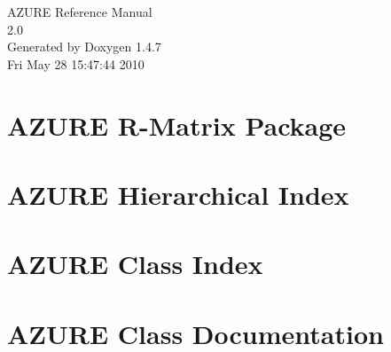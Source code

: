 \documentclass[a4paper]{book}
\begin{document}
\begin{titlepage}
\vspace*{7cm}
\begin{center}
{\Large AZURE Reference Manual\\[1ex]\large 2.0 }\\
\vspace*{1cm}
{\large Generated by Doxygen 1.4.7}\\
\vspace*{0.5cm}
{\small Fri May 28 15:47:44 2010}\\
\end{center}
\end{titlepage}
\clearemptydoublepage
{}
\tableofcontents
\clearemptydoublepage
{}
\chapter{AZURE R-Matrix Package }
\label{index}
\chapter{AZURE Hierarchical Index}

\chapter{AZURE Class Index}

\chapter{AZURE Class Documentation}

































\printindex
\end{document}
